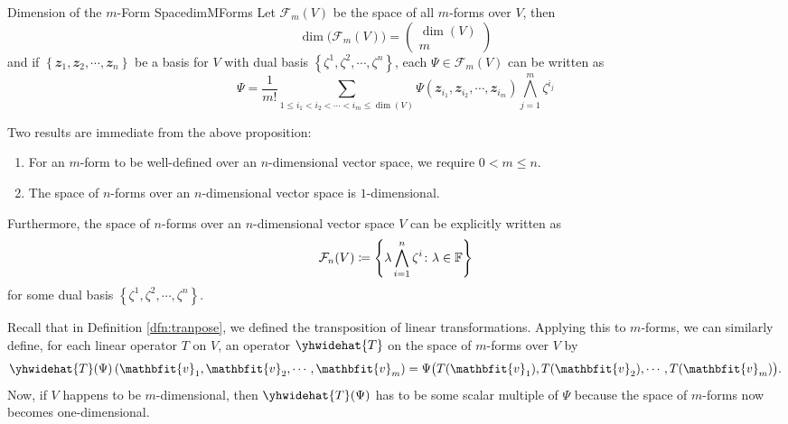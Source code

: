 \documentclass[math, code]{amznotes}
\theoremstyle{remark}
\begin{document}
\begin{probox}{Dimension of the $m$-Form Space}{dimMForms}
    Let $\mathcal{F}_m(V)$ be the space of all $m$-forms over $V$, then 
    \begin{equation*}
        \dim\bigl(\mathcal{F}_m(V)\bigr) = \begin{pmatrix}
            \dim(V) \\
            m
        \end{pmatrix}
    \end{equation*}
    and if  $\left\{\mathbfit{z}_1, \mathbfit{z}_2, \cdots, \mathbfit{z}_n\right\}$ be a basis for $V$ with dual basis $\left\{\zeta^1, \zeta^2, \cdots, \zeta^n\right\}$, each $\Psi \in \mathcal{F}_m(V)$ can be written as 
    \begin{equation*}
        \Psi = \frac{1}{m!}\sum_{1 \leq i_1 < i_2 < \cdots < i_m \leq \dim(V)}\Psi\left(\mathbfit{z}_{i_1}, \mathbfit{z}_{i_2}, \cdots, \mathbfit{z}_{i_m}\right)\bigwedge_{j = 1}^m\zeta^{i_j}
    \end{equation*}
\end{probox}
Two results are immediate from the above proposition:
\begin{enumerate}
    \item For an $m$-form to be well-defined over an $n$-dimensional vector space, we require $0 < m \leq n$.
    \item The space of $n$-forms over an $n$-dimensional vector space is $1$-dimensional.
\end{enumerate}
Furthermore, the space of $n$-forms over an $n$-dimensional vector space $V$ can be explicitly written as 
\begin{equation*}
    \mathcal{F}_n(V) \coloneqq \left\{\lambda\bigwedge_{i = 1}^n\zeta^i \colon \lambda \in \mathbb{F}\right\}
\end{equation*}
for some dual basis $\left\{\zeta^1, \zeta^2, \cdots, \zeta^n\right\}$.

Recall that in Definition \ref{dfn:tranpose}, we defined the transposition of linear transformations. Applying this to $m$-forms, we can similarly define, for each linear operator $T$ on $V$, an operator $\yhwidehat{T}$ on the space of $m$-forms over $V$ by
\begin{equation*}
    \yhwidehat{T}(\Psi)\left(\mathbfit{v}_1, \mathbfit{v}_2, \cdots, \mathbfit{v}_m\right) = \Psi\bigl(T(\mathbfit{v}_1), T(\mathbfit{v}_2), \cdots, T(\mathbfit{v}_m)\bigr).
\end{equation*}
Now, if $V$ happens to be $m$-dimensional, then $\yhwidehat{T}(\Psi)$ has to be some scalar multiple of $\Psi$ because the space of $m$-forms now becomes one-dimensional.
\end{document}
